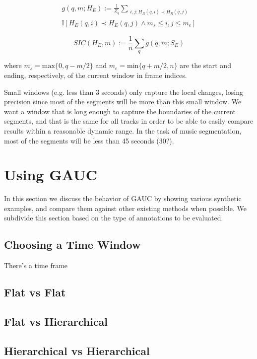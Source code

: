 \documentclass{article}
\begin{document}
\begin{multline}
  g(q, m ; H_E) := \frac{1}{Z_q} \sum_{\substack{i,j : H_R(q, i) \prec H_R(q, j) }} \\ \mathbb{I}\left[ H_E(q, i) \prec H_E(q, j) \land m_s \leq i,j \leq m_e\right]
\end{multline}

\begin{equation}
SIC(H_E,m) := \frac{1}{n} \sum_q g(q,m ; S_E)
\end{equation}

where $m_s = \mbox{max}\{0,q-m/2\}$ and $m_e = \mbox{min}\{q+m/2,n\}$ are the start and ending, respectively, of the current window in frame indices.

Small windows (e.g. less than 3 seconds) only capture the local changes, losing precision since most of the segments will be more than this small window.
We want a window that is long enough to capture the boundaries of the current segments, and that is the same for all tracks in order to be able to easily compare results within a reasonable dynamic range.
In the task of music segmentation, most of the segments will be less than 45 seconds (30?).

\section{Using GAUC}\label{sec:using_method}

In this section we discuss the behavior of GAUC by showing various synthetic examples, and compare them against other existing methods when possible.
We subdivide this section based on the type of annotations to be evaluated.

\subsection{Choosing a Time Window}

There's a time frame 


\subsection{Flat vs Flat}



\subsection{Flat vs Hierarchical}

\subsection{Hierarchical vs Hierarchical}
\end{document}
